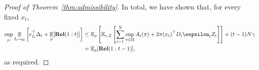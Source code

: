 \documentclass[11pt]{article}
\newcommand{\rel}{\mathbf{Rel}}
\begin{document}
\begin{proof}[Proof of Theorem~\ref{thm:admissibility}]
In total, we have shown that, for every fixed $x_t$,
\begin{align*}
    \sup_{j_t} \mathop{\ex}_{I_t\sim q_t}\left[ e_{I_t}^\top \Delta_t
  + \mathop{\ex}_{\rho}[\rel(1:t)]\right]
  &\leq
    \ex_\rho \left[
  \ex_{\epsilon, Z}\left[
  \sum_{i=1}^N
        \sup_{\pi\in\Pi} A_i(\pi)+
        2\pi(x_t)^\top D_i \eepsilon_t Z_t
  \right]
  \right]
  + (t-1)N\gamma\\
  &=
  \ex_\rho[\rel(1:t-1)],
\end{align*}
as required.
\end{proof}
\end{document}
